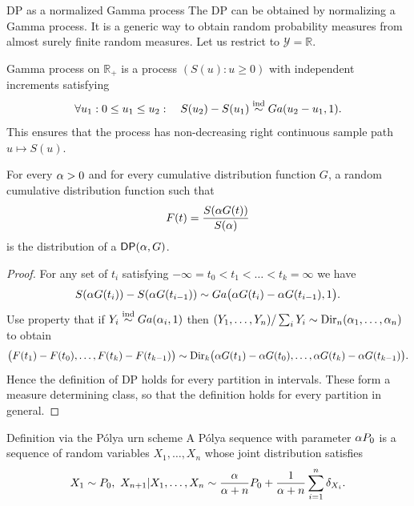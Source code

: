 {DP as a normalized Gamma process}
The DP can be obtained by \alert{normalizing a Gamma process}. It is a generic way to obtain random probability measures from almost surely finite random measures. Let us restrict to $\mathcal{Y}=\mathbb{R}$.
\begin{definition}
Gamma process on $\mathbb{R}_+$ is a process $(S(u):u \geq 0)$ with independent increments satisfying
\begin{equation*}
    \forall u_1: 0 \leq u_1 \leq u_2:\quad S(u_2) - S(u_1)\stackrel{\mbox{\scriptsize{ind}}}{\sim} Ga(u_2-u_1,1).
\end{equation*}
This ensures that the process has non-decreasing right continuous sample path $u\mapsto S(u)$.
\end{definition}

\begin{theorem}
For every $\alpha>0$ and for every cumulative distribution function $G$, a random cumulative distribution function such that
\begin{equation*}
    F(t) = \frac{S(\alpha G(t))}{S(\alpha)}
\end{equation*}
is the distribution of a $\mathsf{DP}(\alpha,G)$.
\end{theorem}

\begin{proof}
For any set of $t_i$ satisfying $-\infty = t_0 < t_1 < \ldots < t_k = \infty$ we have 
$$
S(\alpha G(t_i)) - S(\alpha G(t_{i-1})) \sim Ga\big( \alpha G(t_i)-\alpha G(t_{i-1}),1\big).
$$
Use property that if $Y_i \stackrel{\mbox{\scriptsize{ind}}}{\sim} Ga(\alpha_i, 1)$ then $(Y_1, \ldots, Y_n)/\sum_i Y_i \sim \text{Dir}_n (\alpha_1,\ldots, \alpha_n)$ to obtain 
$$
\big(F(t_1)-F(t_0), \ldots, F(t_k) - F(t_{k-1}) \big) \sim \text{Dir}_k\big(\alpha G(t_1) -\alpha G(t_0), \ldots, \alpha G(t_k) -\alpha G(t_{k-1})\big).
$$
Hence the definition of DP holds for every partition in intervals. These form a measure determining class, so that the definition holds for every partition in general. 
\end{proof}








{Definition via the P\'olya urn scheme}
A P\'olya sequence with parameter $\alpha P_0$ is a sequence of random variables $X_1, \ldots, X_n$ whose joint distribution satisfies
\begin{equation*}
    X_1 \sim P_0,\ X_{n+1}|X_1,\ldots,X_n\sim \frac{\alpha}{\alpha + n}P_0 + \frac{1}{\alpha + n}\sum_{i=1}^n \delta_{X_i}.
\end{equation*}

